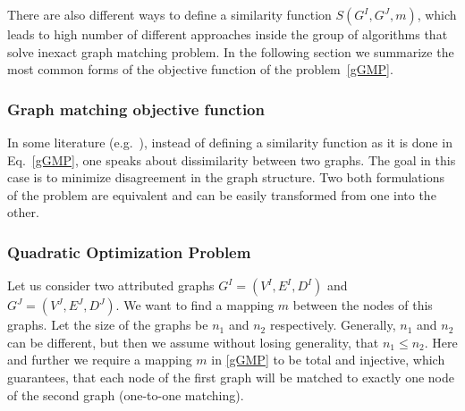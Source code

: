 There are also different ways to define a similarity function $S(G^I,G^J,m)$, which leads to high number of different approaches inside the group of algorithms that solve inexact graph matching problem. In the following section we summarize the most common forms of the objective function of the problem~\eqref{gGMP}.
\subsubsection*{Graph matching objective function}
In some literature (e.g.~\cite{Herault1990_SimulatedAnnealing,FastPFP,Lyzinski2015,Roth2001,Vogelstein_BrainGraphs,Zazlavskiy2008_PATH}), instead of defining a similarity function as it is done in Eq.~\eqref{gGMP}, one speaks about dissimilarity between two graphs. The goal in this case is to minimize disagreement in the graph structure. Two both formulations of the problem are equivalent and can be easily transformed from one into the other.
\subsubsection{Quadratic Optimization Problem}
Let us consider two attributed graphs $G^I = (V^I, E^I,D^I)$ and $G^J = (V^J, E^J,D^J)$. We want to find a mapping $m$ between the nodes of this graphs. Let the size of the graphs be $n_1$ and $n_2$ respectively. Generally, $n_1$ and $n_2$ can be different, but then we assume without losing generality, that $n_1\le n_2$. Here and further we require a mapping $m$ in \eqref{gGMP} to be total and injective, which guarantees, that each node of the first graph will be matched to exactly one node of the second graph (one-to-one matching). 

